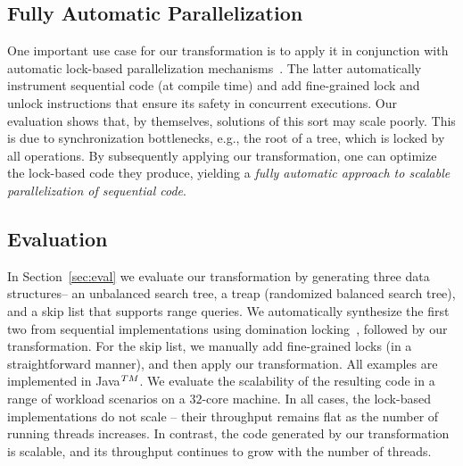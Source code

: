 \subsection{Fully Automatic Parallelization}
One important use case for our transformation is to apply it in conjunction with automatic lock-based
parallelization mechanisms~\cite{Gueta2011,MZGB:POPL06}.
The latter automatically instrument sequential code (at compile time)
and add fine-grained lock and unlock instructions that ensure its safety in concurrent executions.
Our evaluation shows that, by themselves, solutions of this sort may scale poorly.
This is due to synchronization bottlenecks, e.g., the root of a tree,
which is locked by all operations.
By subsequently applying our transformation, one can optimize
the lock-based code they produce, yielding a \emph{fully automatic approach to
scalable parallelization of sequential code}.


\subsection{Evaluation}
In Section~\ref{sec:eval} we evaluate our transformation by generating three data structures-- an unbalanced search tree, a treap
(randomized balanced search tree),
and a skip list that supports range queries. We automatically synthesize the first two from sequential implementations using domination locking~\cite{Gueta2011}, followed by our transformation.
For the skip list, we manually add fine-grained locks (in a straightforward manner), and then apply our transformation.
All examples are implemented in Java$^{\sc TM}$. We evaluate the scalability of the resulting code
in a range of workload scenarios on a $32$-core machine.
In all cases, the lock-based implementations do not scale --
their throughput remains flat as the number of running threads increases. In contrast, the code generated by our transformation
is scalable, and its throughput continues to grow with the number of threads.

